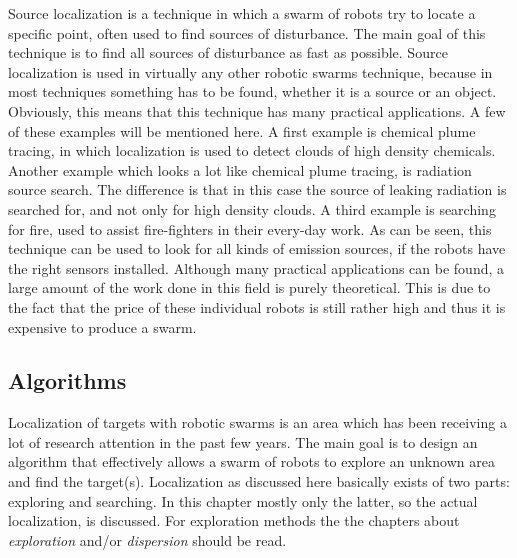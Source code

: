 
Source localization is a technique in which a swarm of robots try to locate a specific point, often used to find sources of disturbance. 
The main goal of this technique is to find all sources of disturbance as fast as possible. 
Source localization is used in virtually any other robotic swarms technique, because in most techniques something has to be found, whether it is a source or an object. \\

Obviously, this means that this technique has many practical applications.
A few of these examples will be mentioned here. 
A first example is chemical plume tracing, in which localization is used to detect clouds of high density chemicals. \cite{zarzhitsky2005distributed}
Another example which looks a lot like chemical plume tracing, is radiation source search. \cite{bashyal2008human} The difference is that in this case the source of leaking radiation is searched for, and not only for high density clouds. 
A third example is searching for fire, used to assist fire-fighters in their every-day work. \cite{marjovi2009multi}
As can be seen, this technique can be used to look for all kinds of emission sources, if the robots have the right sensors installed. \cite{cui2004swarm}
Although many practical applications can be found, a large amount of the work done in this field is purely theoretical.
This is due to the fact that the price of these individual robots is still rather high and thus it is expensive to produce a swarm.




\subsection{Algorithms}
Localization of targets with robotic swarms is an area which has been receiving a lot of research attention in the past few years. 
The main goal is to design an algorithm that effectively allows a swarm of robots to explore an unknown area and find the target(s).
Localization as discussed here basically exists of two parts: exploring and searching.
In this chapter mostly only the latter, so the actual localization, is discussed.
For exploration methods the the chapters about \emph{exploration} and/or \emph{dispersion} should be read.


